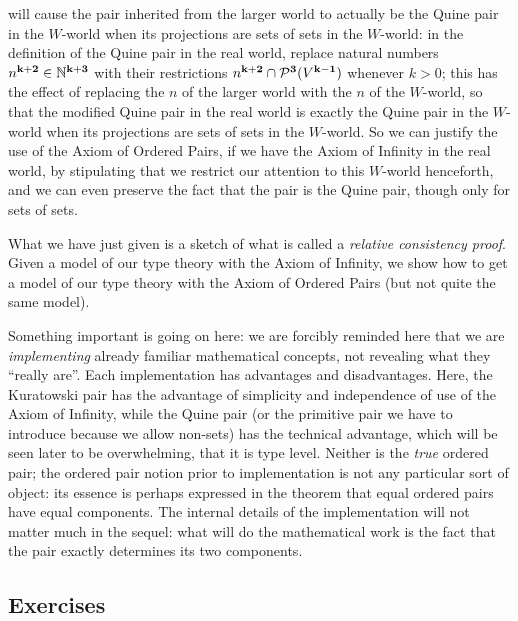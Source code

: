\documentclass[12pt]{book}
\begin{document}
will cause the pair inherited from the larger world to actually be the Quine pair in the $W$-world when its projections are sets of sets in the $W$-world:  in the definition of the Quine pair in the real world, replace natural numbers
$n^{\bf k+2} \in {\mathbb N}^{\bf k+3}$ with their restrictions  $n^{\bf k+2} \cap {\cal P}^{\bf 3}(V^{\bf k-1})$ whenever $k>0$;  this has the effect of replacing the $n$ of the larger world with the $n$ of the $W$-world, so that the modified Quine pair in the real world is exactly the Quine pair in the $W$-world when its projections are sets of sets in the $W$-world.  So we can justify the use of the Axiom of Ordered Pairs, if we have the Axiom of Infinity in the real world, by stipulating that we restrict our attention to this $W$-world henceforth, and we can even preserve the fact that the pair is the Quine pair, though only for sets of sets.  

What we have just given is a sketch of what is called a {\em relative
consistency proof\/}.  Given a model of our type theory with the Axiom
of Infinity, we show how to get a model of our type theory with the
Axiom of Ordered Pairs (but not quite the same model).

Something important is going on here: we are forcibly reminded here
that we are {\em implementing\/} already familiar mathematical
concepts, not revealing what they ``really are''.  Each implementation
has advantages and disadvantages.  Here, the Kuratowski pair has the
advantage of simplicity and independence of use of the Axiom of
Infinity, while the Quine pair (or the primitive pair we have to
introduce because we allow non-sets) has the technical advantage,
which will be seen later to be overwhelming, that it is type level.
Neither is the {\em true\/} ordered pair; the ordered pair notion
prior to implementation is not any particular sort of object: its
essence is perhaps expressed in the theorem that equal ordered pairs
have equal components.  The internal details of the implementation
will not matter much in the sequel: what will do the mathematical work
is the fact that the pair exactly determines its two components.

\newpage

\subsection{Exercises}
\end{document}
